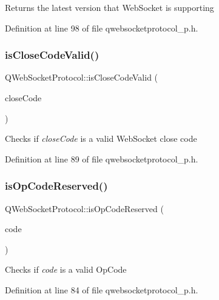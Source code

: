Returns the latest version that Web\+Socket is supporting 

Definition at line 98 of file qwebsocketprotocol\+\_\+p.\+h.

\mbox{\label{namespace_q_web_socket_protocol_a201c6003f6d4aebf169228aeae467fc2}} 
\subsubsection{\texorpdfstring{is\+Close\+Code\+Valid()}{isCloseCodeValid()}}
{\footnotesize\ttfamily Q\+Web\+Socket\+Protocol\+::is\+Close\+Code\+Valid (\begin{DoxyParamCaption}\item[{int}]{close\+Code }\end{DoxyParamCaption})\hspace{0.3cm}{\ttfamily [inline]}}

Checks if {\itshape close\+Code} is a valid Web\+Socket close code 

Definition at line 89 of file qwebsocketprotocol\+\_\+p.\+h.

\mbox{\label{namespace_q_web_socket_protocol_aa92196a840dd7588e5e7745439d01b84}} 
\subsubsection{\texorpdfstring{is\+Op\+Code\+Reserved()}{isOpCodeReserved()}}
{\footnotesize\ttfamily Q\+Web\+Socket\+Protocol\+::is\+Op\+Code\+Reserved (\begin{DoxyParamCaption}\item[{\mbox{\hyperlink{namespace_q_web_socket_protocol_a93d3033ae9be614a2bc8f76c792e2e14}{Op\+Code}}}]{code }\end{DoxyParamCaption})\hspace{0.3cm}{\ttfamily [inline]}}

Checks if {\itshape code} is a valid Op\+Code 

Definition at line 84 of file qwebsocketprotocol\+\_\+p.\+h.

